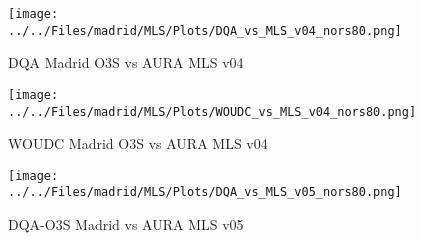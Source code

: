                             \begin{figure}
        \centering
\texttt{[image: ../../Files/madrid/MLS/Plots/DQA\_vs\_MLS\_v04\_nors80.png]}
    \caption{DQA Madrid O3S vs AURA MLS v04 }
            \label{fig:rawv04}
    \end{figure}

                                \begin{figure}
        \centering
\texttt{[image: ../../Files/madrid/MLS/Plots/WOUDC\_vs\_MLS\_v04\_nors80.png]}
    \caption{ WOUDC Madrid O3S vs AURA MLS v04  }
            \label{fig:ndaccv04}
    \end{figure}


                                \begin{figure}
        \centering
\texttt{[image: ../../Files/madrid/MLS/Plots/DQA\_vs\_MLS\_v05\_nors80.png]}
    \caption{DQA-O3S Madrid vs AURA MLS v05 }
            \label{fig:o3sv04}
    \end{figure}








